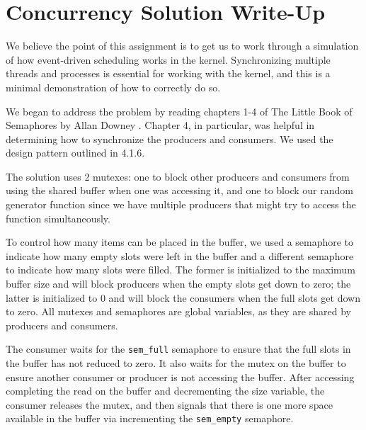 \documentclass[letterpaper, onecolumn, draftclsnofoot, 10pt, compsoc]{IEEEtran}
\begin{document}
\section{Concurrency Solution Write-Up}
    \begin{singlespace}
            We believe the point of this assignment is to  get us to work through a simulation of how event-driven scheduling works in the kernel.
            Synchronizing multiple threads and processes is essential for working with the kernel, and this is a minimal demonstration of how to correctly do so.   \par
            We began to address the problem by reading chapters 1-4 of The Little Book of Semaphores by Allan Downey \cite{DowneyBOS}. 
            Chapter 4, in particular, was helpful in determining how to synchronize the producers and consumers. 
            We used the design pattern outlined in 4.1.6.\par
            
            The solution uses 2 mutexes: one to block other producers and consumers from using the shared buffer when one was accessing it, and one to block our random generator function since we have multiple producers that might try to access the function simultaneously.
            \par
            
            To control how many items can be placed in the buffer, we used a semaphore to indicate how many empty slots were left in the buffer and a different semaphore to indicate how many slots were filled. 
            The former is initialized to the maximum buffer size and will block producers when the empty slots get down to zero; 
            the latter is initialized to 0 and will block the consumers when the full slots get down to zero.
            All mutexes and semaphores are global variables, as they are shared by producers and consumers.\par

            The consumer waits for the \texttt{sem\_full} semaphore to ensure that the full slots in the buffer has not reduced to zero.
            It also waits for the mutex on the buffer to ensure another consumer or producer is not accessing the buffer.
            After accessing completing the read on the buffer and decrementing the size variable, the consumer releases the mutex, and then signals that there is one more space available in the buffer via incrementing the \texttt{sem\_empty} semaphore.


\end{singlespace}
\end{document}
